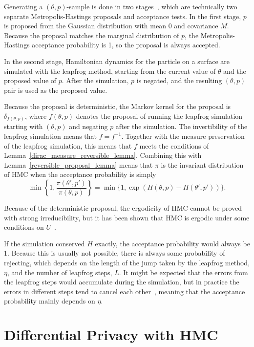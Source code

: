 \documentclass[english,twoside,openright]{HYgraduMLDS}
\begin{document}
Generating a \((\theta, p)\)-sample is done in two stages~\cite{neal2012mcmc}, 
which are technically 
two separate Metropolis-Hastings proposals and acceptance tests. In the first 
stage, \(p\) is proposed from the Gaussian distribution with mean 0 and 
covariance \(M\). Because the proposal matches the marginal distribution of 
\(p\), the Metropolis-Hastings acceptance probability is 1, so the proposal
is always accepted.

In the second stage, Hamiltonian dynamics for the particle on a surface are 
simulated with the leapfrog method, starting from the current value 
of \(\theta\) and the proposed value of \(p\). After the simulation,
\(p\) is negated, and the resulting \((\theta, p)\) pair is used as the
proposed value.

Because the proposal is deterministic, the Markov kernel for the
proposal is \(\delta_{f(\theta, p)}\), where \(f(\theta, p)\) denotes the proposal
of running the leapfrog simulation starting with \((\theta, p)\) and negating
\(p\) after the simulation. The invertibility of the leapfrog simulation means
that \(f = f^{-1}\). Together with the measure preservation of the leapfrog
simulation, this means that \(f\) meets the conditions of
Lemma~\ref{dirac_measure_reversible_lemma}. Combining this with
Lemma~\ref{reversible_proposal_lemma} means that \(\pi\) is the invariant
distribution of HMC when the acceptance probability is simply
\[
  \min\left\{1, \frac{\pi(\theta', p')}{\pi(\theta, p)}\right\}
  = \min\{1, \exp(H(\theta, p) - H(\theta', p'))\}.
\]

Because of the deterministic proposal, the ergodicity of HMC cannot be
proved with strong irreducibility, but it has been shown that HMC is
ergodic under some conditions on \(U\)~\cite{DMS19}.

If the simulation conserved \(H\) exactly, the acceptance probability would 
always be 1. Because this is usually not possible, there is always some probability 
of rejecting, which depends on the length of the jump taken by the leapfrog 
method, \(\eta\), and the number of leapfrog steps, \(L\). It might be expected 
that the errors from the leapfrog steps would accumulate during the simulation, 
but in practice the errors in different steps tend to cancel each 
other~\cite{neal2012mcmc}, meaning 
that the acceptance probability mainly depends on \(\eta\).

\section{Differential Privacy with HMC}\label{dp_hmc_section}
\end{document}
